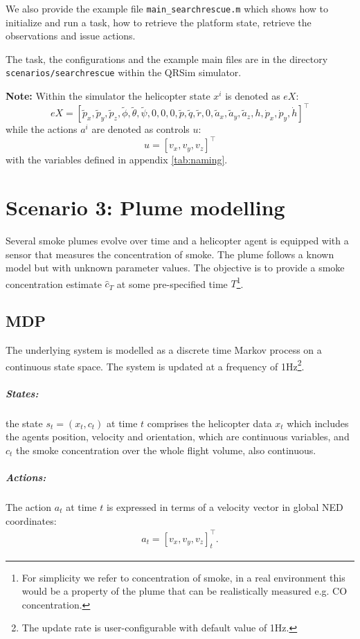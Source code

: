 \documentclass[a4paper,11pt]{report}
\newcommand{\sname}{QRSim\xspace}
\newcommand\mytexttt[1]{\texttt{\hyphenchar\font=45\relax #1}}
\begin{document}
We also provide the example file \texttt{main\_searchrescue.m} which shows how to initialize and run a task, how to retrieve the platform state, retrieve the observations and issue actions.

The task, the configurations and the example main files are in the directory \mytexttt{scenarios/searchrescue} within the \sname simulator. 

\textbf{Note:}
Within the simulator the helicopter state $x^i$ is denoted as $eX$:
$$eX = [\tilde{p}_x,\tilde{p}_y,\tilde{p}_z,\tilde{\phi},\tilde{\theta},\tilde{\psi},0,0,0,\tilde{p},\tilde{q},\tilde{r},0,\tilde{a}_x,\tilde{a}_y,\tilde{a}_z,h,\dot{p}_x,\dot{p}_y,\dot{h}]^\intercal$$
while the actions $a^i$ are denoted as controls $u$:
$$u=[v_x,v_y,v_z]^\intercal$$
with the variables defined in appendix \ref{tab:naming}.

\newpage
\chapter{Scenario 3: Plume modelling}
Several smoke plumes evolve over time and a helicopter agent is equipped with a sensor that measures the concentration of smoke. The plume follows a known model but with unknown parameter values. The objective is to provide a smoke concentration estimate $\hat{c}_T$ at some pre-specified time $T$\footnote{For simplicity we refer to concentration of smoke, in a real environment this would be a property of the plume that can be realistically measured e.g. CO concentration.}.

\section{MDP}
The underlying system is modelled as a discrete time Markov process on a continuous state space. The system is updated at a frequency of 1Hz\footnote{The update rate is user-configurable with default value of 1Hz.}. 

\paragraph{States:} the state $s_t=(x_t,c_t)$ at time $t$ comprises the helicopter data $x_t$ which includes the agents position, velocity and orientation, which are continuous variables, and $c_t$ the smoke concentration over the whole flight volume, also continuous.

\paragraph{Actions:}
The action $a_t$ at time $t$ is expressed in terms of a velocity vector in global NED coordinates:
\begin{align}
a_t=[v_x,v_y,v_z]_t^\intercal.
\end{align}
\end{document}
